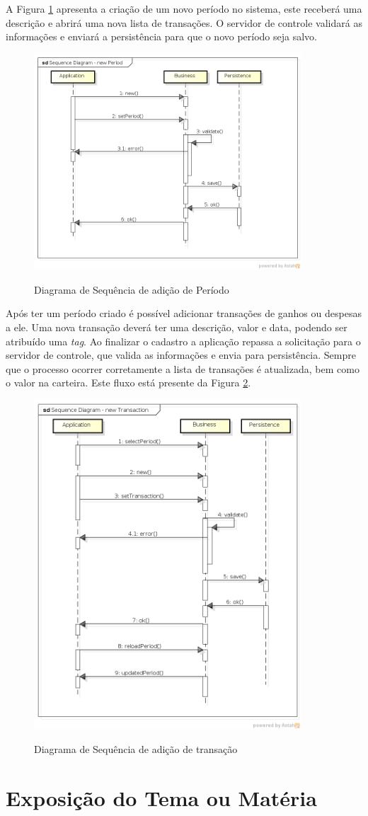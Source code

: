 A Figura \ref{SeqPeriod} apresenta a criação de um novo período no sistema, este receberá uma descrição e abrirá uma nova lista de transações. O servidor de controle validará as informações e enviará a persistência para que o novo período seja salvo.

\begin{figure}[!htb]
	\caption{Diagrama de Sequência de adição de Período}
	{\parbox{6cm}{
			\includegraphics[width=10cm]{images/SequenceDiagramNewPeriod.png}
			\label{SeqPeriod}
	}}
\end{figure}

Após ter um período criado é possível adicionar transações de ganhos ou despesas a ele. Uma nova transação deverá ter uma descrição, valor e data, podendo ser atribuído uma \textit{tag}. Ao finalizar o cadastro a aplicação repassa a solicitação para o servidor de controle, que valida as informações e envia para persistência. Sempre que o processo ocorrer corretamente a lista de transações é atualizada, bem como o valor na carteira. Este fluxo está presente da Figura \ref{SeqTransaction}.

\begin{figure}[!htb]
	\caption{Diagrama de Sequência de adição de transação}
	{\parbox{6cm}{
			\includegraphics[width=10cm]{images/SequenceDiagramNewTransaction.png}
			\label{SeqTransaction}
	}}
\end{figure}

\section{Exposição do Tema ou Matéria}